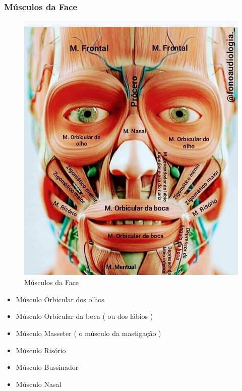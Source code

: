 \documentclass[
]{book}
\providecommand{\tightlist}{%
  \setlength{\itemsep}{0pt}\setlength{\parskip}{0pt}}
\begin{document}
\hypertarget{muxfasculos-da-face}{%
\subsubsection{Músculos da Face}\label{muxfasculos-da-face}}

\begin{figure}

{\centering \includegraphics[width=0.9\linewidth]{figuras/Aula5-3-musculos-da-face} 

}

\caption{Músculos da Face}\label{fig:unnamed-chunk-8}
\end{figure}

\begin{itemize}
\tightlist
\item
  Músculo Orbicular dos olhos
\item
  Músculo Orbicular da boca ( ou dos lábios )
\item
  Músculo Masseter ( o músculo da mastigação )
\item
  Músculo Risório
\item
  Músculo Bussinador
\item
  Músculo Nasal
\end{itemize}
\end{document}
